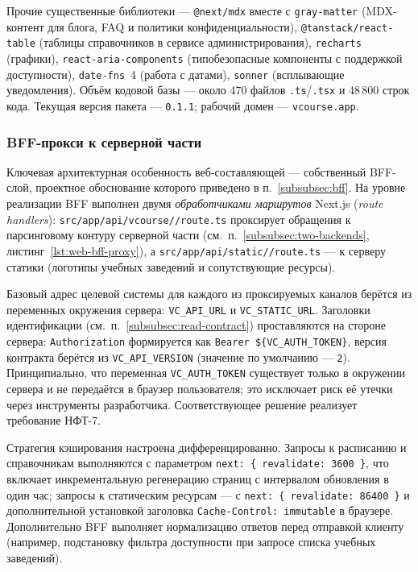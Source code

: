 Прочие существенные библиотеки --- \texttt{@next/\allowbreak mdx} вместе с \texttt{gray-matter} (MDX-контент для блога, FAQ и политики конфиденциальности), \texttt{@tanstack/\allowbreak react-table} (таблицы справочников в сервисе администрирования), \texttt{recharts} (графики), \texttt{react-aria-components} (типобезопасные компоненты с поддержкой доступности), \texttt{date-fns}~4 (работа с датами), \texttt{sonner} (всплывающие уведомления). Объём кодовой базы --- около 470 файлов \texttt{.ts}/\texttt{.tsx} и 48\,800 строк кода. Текущая версия пакета --- \texttt{0.1.1}; рабочий домен --- \texttt{vcourse.app}.

\subsubsection{BFF-прокси к серверной части}
\label{subsubsec:impl-web-bff}

Ключевая архитектурная особенность веб-составляющей --- собственный BFF-слой, проектное обоснование которого приведено в п.~\ref{subsubsec:bff}. На уровне реализации BFF выполнен двумя \emph{обработчиками маршрутов} Next.js (\emph{route handlers}): \texttt{src/\allowbreak app/\allowbreak api/\allowbreak vcourse/\allowbreak [...path]/\allowbreak route.\allowbreak ts} проксирует обращения к парсинговому контуру серверной части (см.~п.~\ref{subsubsec:two-backends}, листинг~\ref{lst:web-bff-proxy}), а \texttt{src/\allowbreak app/\allowbreak api/\allowbreak static/\allowbreak [...path]/\allowbreak route.\allowbreak ts} --- к серверу статики (логотипы учебных заведений и сопутствующие ресурсы).

Базовый адрес целевой системы для каждого из проксируемых каналов берётся из переменных окружения сервера: \texttt{VC\_\allowbreak API\_\allowbreak URL} и \texttt{VC\_\allowbreak STATIC\_\allowbreak URL}. Заголовки идентификации (см.~п.~\ref{subsubsec:read-contract}) проставляются на стороне сервера: \texttt{Authorization} формируется как \texttt{Bearer~\$\{VC\_\allowbreak AUTH\_\allowbreak TOKEN\}}, версия контракта берётся из \texttt{VC\_\allowbreak API\_\allowbreak VERSION} (значение по умолчанию --- \texttt{2}). Принципиально, что переменная \texttt{VC\_\allowbreak AUTH\_\allowbreak TOKEN} существует только в окружении сервера и не передаётся в браузер пользователя; это исключает риск её утечки через инструменты разработчика. Соответствующее решение реализует требование НФТ-7.

Стратегия кэширования настроена дифференцированно. Запросы к расписанию и справочникам выполняются с параметром \texttt{next:\,\{\,revalidate:\,3600\,\}}, что включает инкрементальную регенерацию страниц с интервалом обновления в один час; запросы к статическим ресурсам --- с \texttt{next:\,\{\,revalidate:\,86400\,\}} и дополнительной установкой заголовка \texttt{Cache-Control:\,immutable} в браузере. Дополнительно BFF выполняет нормализацию ответов перед отправкой клиенту (например, подстановку фильтра доступности при запросе списка учебных заведений).

